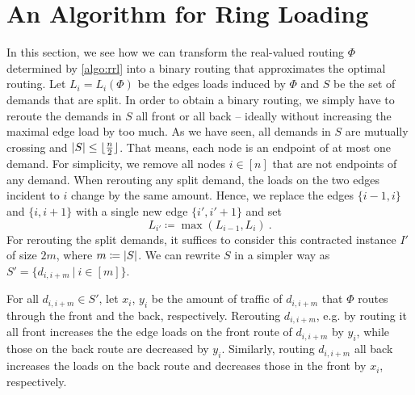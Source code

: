 \section{An Algorithm for Ring Loading}
\label{sec:ring-loading}

In this section, we see how we can transform the real-valued routing $\Phi$ determined by \cref{algo:rrl} into a binary routing that approximates the optimal routing.
Let $L_i = L_i(\Phi)$ be the edges loads induced by $\Phi$ and $S$ be the set of demands that are split.
In order to obtain a binary routing, we simply have to reroute the demands in $S$ all front or all back -- ideally without increasing the maximal edge load by too much. 
As we have seen, all demands in $S$ are mutually crossing and $\abs{S} \leq \lfloor \frac{n}{2} \rfloor$.
That means, each node is an endpoint of at most one demand.
For simplicity, we remove all nodes $i \in [n]$ that are not endpoints of any demand.
When rerouting any split demand, the loads on the two edges incident to $i$ change by the same amount.
Hence, we replace the edges $\{i-1, i\}$ and $\{i, i+1\}$ with a single new edge $\{i', i'+1\}$ and set 
\begin{equation}
	L_{i'} \coloneqq \max(L_{i-1}, L_i) \ .
\end{equation}
For rerouting the split demands, it suffices to consider this contracted instance $I'$ of size $2m$, where $m \coloneqq \abs{S}$.
We can rewrite $S$ in a simpler way as $S' = \{d_{i, i+m}\ |\ i \in [m]\}$.

For all $d_{i, i+m} \in S'$, let $x_i$, $y_i$ be the amount of traffic of $d_{i, i+m}$ that $\Phi$ routes through the front and the back, respectively.
Rerouting $d_{i, i+m}$, e.g. by routing it all front increases the the edge loads on the front route of $d_{i, i+m}$ by $y_i$, while those on the back route are decreased by $y_i$.
Similarly, routing $d_{i, i+m}$ all back increases the loads on the back route and decreases those in the front by $x_i$, respectively.

